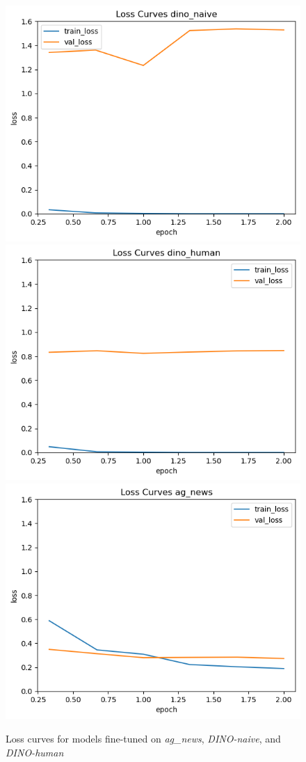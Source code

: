 \documentclass[11pt]{article}
\begin{document}
\begin{figure}[t]
    \centering
    \includegraphics[width=0.85\linewidth]{naivecurve.png}
    \includegraphics[width=0.85\linewidth]{humancurve.png}
    \includegraphics[width=0.85\linewidth]{agcurve.png}
    \caption{Loss curves for models fine-tuned on \textit{ag\_news}, \textit{DINO-naive}, and \textit{DINO-human}}
    \label{fig:threelosscurves}
\end{figure}
\end{document}
